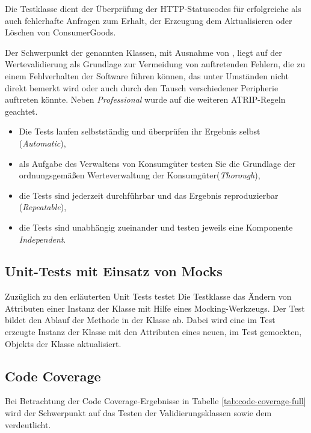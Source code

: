 Die Testklasse  dient der Überprüfung der \ac{HTTP}-Statuscodes für erfolgreiche als auch fehlerhafte Anfragen zum Erhalt, der Erzeugung dem Aktualisieren oder Löschen von ConsumerGoods.

Der Schwerpunkt der genannten Klassen, mit Ausnahme von , liegt auf der Wertevalidierung als Grundlage zur Vermeidung von auftretenden Fehlern, die zu einem Fehlverhalten der Software führen können, das unter Umständen nicht direkt bemerkt wird oder auch durch den Tausch verschiedener Peripherie auftreten könnte.
Neben \textit{Professional} wurde auf die weiteren ATRIP-Regeln geachtet.
\begin{itemize}
    \item Die Tests laufen selbstständig und überprüfen ihr Ergebnis selbst (\textit{Automatic}),
    \item als Aufgabe des Verwaltens von Konsumgüter testen Sie die Grundlage der ordnungsgemäßen Werteverwaltung der Konsumgüter(\textit{Thorough}),
    \item die Tests sind jederzeit durchführbar und das Ergebnis reproduzierbar (\textit{Repeatable}),
    \item die Tests sind unabhängig zueinander und testen jeweils eine Komponente \textit{Independent}.
\end{itemize}

\subsection*{Unit-Tests mit Einsatz von Mocks}
Zuzüglich zu den erläuterten Unit Tests testet Die Testklasse  das Ändern von Attributen einer Instanz der Klasse  mit Hilfe eines Mocking-Werkzeugs.
Der Test bildet den Ablauf der Methode  in der Klasse  ab.
Dabei wird eine im Test erzeugte Instanz der Klasse  mit den Attributen eines neuen, im Test gemockten, Objekts der Klasse  aktualisiert.



\subsection*{Code Coverage}
Bei Betrachtung der Code Coverage-Ergebnisse in Tabelle \ref{tab:code-coverage-full} wird der Schwerpunkt auf das Testen der Validierungsklassen sowie dem  verdeutlicht.

